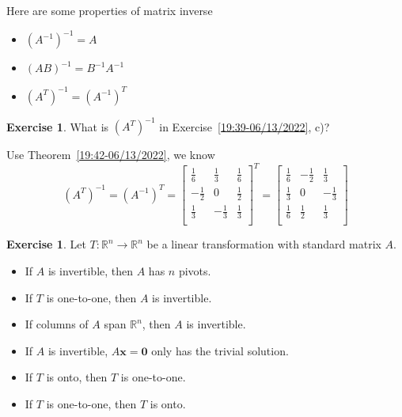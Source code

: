 \documentclass{beamer}
\theoremstyle{definition}
\newtheorem{exercise}[theorem]{Exercise}
\theoremstyle{remark}
\begin{document}
\begin{frame}[t]
\begin{theorem}\label{19:42-06/13/2022}
Here are some properties of matrix inverse
\begin{itemize}
\item $(A^{-1})^{-1}=A$\pause
\item $(AB)^{-1}=B^{-1}A^{-1}$\pause
\item $(A^T)^{-1}=(A^{-1})^T$
\end{itemize}
\end{theorem}
\pause
\begin{exercise}
What is $(A^T)^{-1}$ in Exercise~\ref{19:39-06/13/2022}, c)?
\end{exercise}
\pause
\begin{solution}
Use Theorem~\ref{19:42-06/13/2022}, we know
\[
(A^T)^{-1}=(A^{-1})^T=\begin{bmatrix}
\frac{1}{6}&\frac{1}{3}&\frac{1}{6}\\
-\frac{1}{2}&0&\frac{1}{2}\\
\frac{1}{3}&-\frac{1}{3}&\frac{1}{3}\\
\end{bmatrix}^T=\begin{bmatrix}
\frac{1}{6}&-\frac{1}{2}&\frac{1}{3}\\
\frac{1}{3}&0&-\frac{1}{3}\\
\frac{1}{6}&\frac{1}{2}&\frac{1}{3}\\
\end{bmatrix}
\]
\end{solution}
\end{frame}

\begin{frame}[t]
\begin{exercise}
Let $T:\mathbb R^n\to\mathbb R^n$ be a linear transformation with standard matrix $A$.
\begin{itemize}
\item If $A$ is invertible, then $A$ has $n$ pivots\pause. 
\item If $T$ is one-to-one, then $A$ is invertible\pause. 
\item If columns of $A$ span $\mathbb R^n$, then $A$ is invertible\pause. 
\item If $A$ is invertible, $A\mathbf x=\mathbf0$ only has the trivial solution\pause.  
\item If $T$ is onto, then $T$ is one-to-one\pause. 
\item If $T$ is one-to-one, then $T$ is onto\pause. 
\end{itemize}
\end{exercise}
\end{frame}
\end{document}
